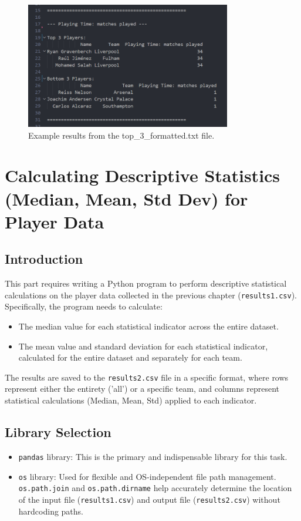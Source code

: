 \documentclass[12pt, a4paper]{report}
\begin{document}
\begin{figure}[H]
    \centering
    \includegraphics[width=0.8\textwidth]{top_3.png}
    \caption{Example results from the top\_3\_formatted.txt file.}
    \label{fig:top3_output}
\end{figure}

\section{Calculating Descriptive Statistics (Median, Mean, Std Dev) for Player Data}

\subsection{Introduction}
This part requires writing a Python program to perform descriptive statistical calculations on the player data collected in the previous chapter (\texttt{results1.csv}).
Specifically, the program needs to calculate:
\begin{itemize}
\renewcommand{\labelitemi}{}
    \item The median value for each statistical indicator across the entire dataset.
    \item The mean value and standard deviation for each statistical indicator, calculated for the entire dataset and separately for each team.
\end{itemize}
The results are saved to the \texttt{results2.csv} file in a specific format, where rows represent either the entirety ('all') or a specific team, and columns represent statistical calculations (Median, Mean, Std) applied to each indicator.

\subsection{Library Selection}
\begin{itemize}[leftmargin=0em]
\renewcommand{\labelitemi}{}
    \item \texttt{pandas} library: This is the primary and indispensable library for this task.
    \item \texttt{os} library: Used for flexible and OS-independent file path management. \texttt{os.path.join} and \texttt{os.path.dirname} help accurately determine the location of the input file (\texttt{results1.csv}) and output file (\texttt{results2.csv}) without hardcoding paths.
\end{itemize}
\end{document}
